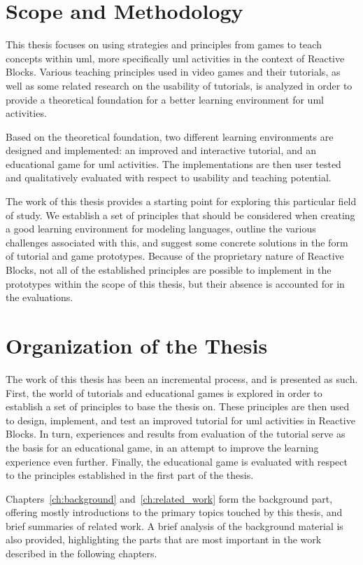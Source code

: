 \section{Scope and Methodology}
\label{sec:scope}
This thesis focuses on using strategies and principles from games to teach concepts within \gls{uml}, more specifically \gls{uml} activities in the context of Reactive Blocks. Various teaching principles used in video games and their tutorials, as well as some related research on the usability of tutorials, is analyzed in order to provide a theoretical foundation for a better learning environment for \gls{uml} activities.

\noindent
Based on the theoretical foundation, two different learning environments are designed and implemented: an improved and interactive tutorial, and an educational game for \gls{uml} activities. The implementations are then user tested and qualitatively evaluated with respect to usability and teaching potential.

\noindent
The work of this thesis provides a starting point for exploring this particular field of study. We establish a set of principles that should be considered when creating a good learning environment for modeling languages, outline the various challenges associated with this, and suggest some concrete solutions in the form of tutorial and game prototypes. Because of the proprietary nature of Reactive Blocks, not all of the established principles are possible to implement in the prototypes within the scope of this thesis, but their absence is accounted for in the evaluations.

\section{Organization of the Thesis}
\label{sec:organization}
The work of this thesis has been an incremental process, and is presented as such. First, the world of tutorials and educational games is explored in order to establish a set of principles to base the thesis on. These principles are then used to design, implement, and test an improved tutorial for \gls{uml} activities in Reactive Blocks. In turn, experiences and results from evaluation of the tutorial serve as the basis for an educational game, in an attempt to improve the learning experience even further. Finally, the educational game is evaluated with respect to the principles established in the first part of the thesis.

\noindent
Chapters~\ref{ch:background} and~\ref{ch:related_work} form the background part, offering mostly introductions to the primary topics touched by this thesis, and brief summaries of related work. A brief analysis of the background material is also provided, highlighting the parts that are most important in the work described in the following chapters.


